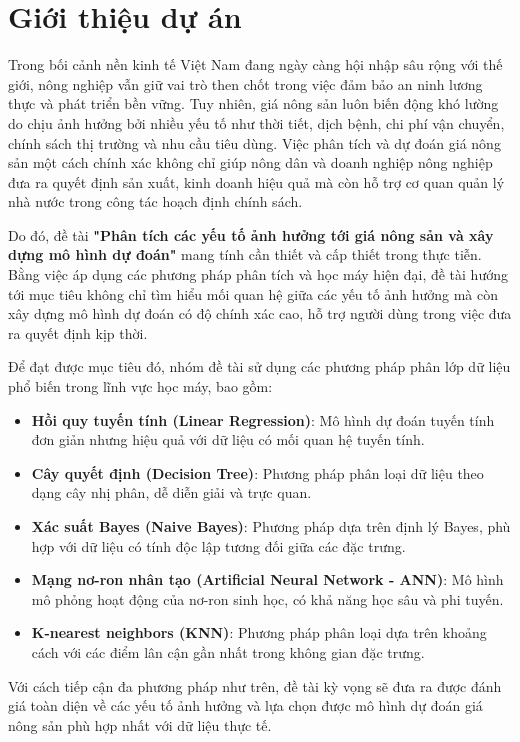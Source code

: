 \section{Giới thiệu dự án}

Trong bối cảnh nền kinh tế Việt Nam đang ngày càng hội nhập sâu rộng với thế giới, nông nghiệp vẫn giữ vai trò then chốt trong việc đảm bảo an ninh lương thực và phát triển bền vững. Tuy nhiên, giá nông sản luôn biến động khó lường do chịu ảnh hưởng bởi nhiều yếu tố như thời tiết, dịch bệnh, chi phí vận chuyển, chính sách thị trường và nhu cầu tiêu dùng. Việc phân tích và dự đoán giá nông sản một cách chính xác không chỉ giúp nông dân và doanh nghiệp nông nghiệp đưa ra quyết định sản xuất, kinh doanh hiệu quả mà còn hỗ trợ cơ quan quản lý nhà nước trong công tác hoạch định chính sách.

Do đó, đề tài \textbf{"Phân tích các yếu tố ảnh hưởng tới giá nông sản và xây dựng mô hình dự đoán"} mang tính cần thiết và cấp thiết trong thực tiễn. Bằng việc áp dụng các phương pháp phân tích và học máy hiện đại, đề tài hướng tới mục tiêu không chỉ tìm hiểu mối quan hệ giữa các yếu tố ảnh hưởng mà còn xây dựng mô hình dự đoán có độ chính xác cao, hỗ trợ người dùng trong việc đưa ra quyết định kịp thời.

Để đạt được mục tiêu đó, nhóm đề tài sử dụng các phương pháp phân lớp dữ liệu phổ biến trong lĩnh vực học máy, bao gồm:

\begin{itemize}
    \item \textbf{Hồi quy tuyến tính (Linear Regression)}: Mô hình dự đoán tuyến tính đơn giản nhưng hiệu quả với dữ liệu có mối quan hệ tuyến tính.
    \item \textbf{Cây quyết định (Decision Tree)}: Phương pháp phân loại dữ liệu theo dạng cây nhị phân, dễ diễn giải và trực quan.
    \item \textbf{Xác suất Bayes (Naive Bayes)}: Phương pháp dựa trên định lý Bayes, phù hợp với dữ liệu có tính độc lập tương đối giữa các đặc trưng.
    \item \textbf{Mạng nơ-ron nhân tạo (Artificial Neural Network - ANN)}: Mô hình mô phỏng hoạt động của nơ-ron sinh học, có khả năng học sâu và phi tuyến.
    \item \textbf{K-nearest neighbors (KNN)}: Phương pháp phân loại dựa trên khoảng cách với các điểm lân cận gần nhất trong không gian đặc trưng.
\end{itemize}

Với cách tiếp cận đa phương pháp như trên, đề tài kỳ vọng sẽ đưa ra được đánh giá toàn diện về các yếu tố ảnh hưởng và lựa chọn được mô hình dự đoán giá nông sản phù hợp nhất với dữ liệu thực tế.
